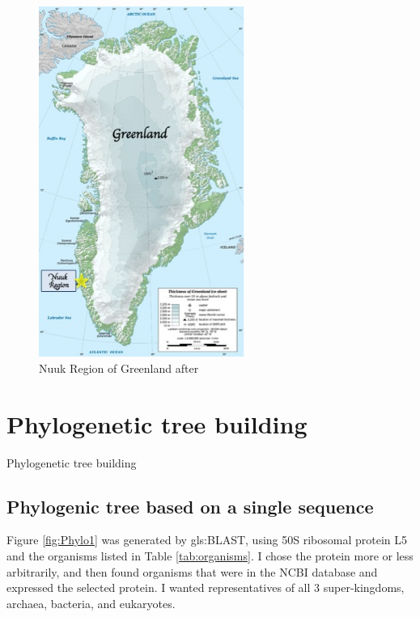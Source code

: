 \documentclass[]{article}
\begin{document}
\begin{figure}[H]
\begin{center}
		\caption[Nuuk Region of Greenland]{Nuuk Region of Greenland after \cite{enwiki:1095301862}}\label{fig:nuuk}
		\includegraphics[width=0.6\textwidth]{Nuuk_Location}
	\end{center}
\end{figure}
\section{Phylogenetic tree building}
Phylogenetic tree building \cite{altschul1990basic}

\subsection{Phylogenic tree based on a single sequence}

Figure \ref{fig:Phylo1} was generated by \gls{gls:BLAST}, using 50S ribosomal protein L5 and the organisms listed in Table \ref{tab:organisms}. I chose the protein more or less arbitrarily, and then found organisms that were in the NCBI database and expressed the selected protein. I wanted representatives of all 3 super-kingdoms, archaea, bacteria, and eukaryotes.
\end{document}
